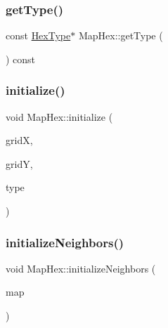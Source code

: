\mbox{\label{class_map_hex_af29bc51cd2e5bfeebd655167a2309f0d}} 
\subsubsection{\texorpdfstring{get\+Type()}{getType()}}
{\footnotesize\ttfamily const \hyperlink{class_hex_type}{Hex\+Type}$\ast$ Map\+Hex\+::get\+Type (\begin{DoxyParamCaption}{ }\end{DoxyParamCaption}) const\hspace{0.3cm}{\ttfamily [inline]}}

\mbox{\label{class_map_hex_a325e5009a0b83dfda7cc97fa3b3f9599}} 
\subsubsection{\texorpdfstring{initialize()}{initialize()}}
{\footnotesize\ttfamily void Map\+Hex\+::initialize (\begin{DoxyParamCaption}\item[{uint16\+\_\+t}]{gridX,  }\item[{uint16\+\_\+t}]{gridY,  }\item[{\hyperlink{class_hex_type}{Hex\+Type} $\ast$}]{type }\end{DoxyParamCaption})}

\mbox{\label{class_map_hex_a325a38d569568972bf2503056609f283}} 
\subsubsection{\texorpdfstring{initialize\+Neighbors()}{initializeNeighbors()}}
{\footnotesize\ttfamily void Map\+Hex\+::initialize\+Neighbors (\begin{DoxyParamCaption}\item[{\hyperlink{class_game_map}{Game\+Map} $\ast$}]{map }\end{DoxyParamCaption})}

\mbox{\label{class_map_hex_a16e97b71ca65b0f74f7c0c343e2c2e0a}} 
